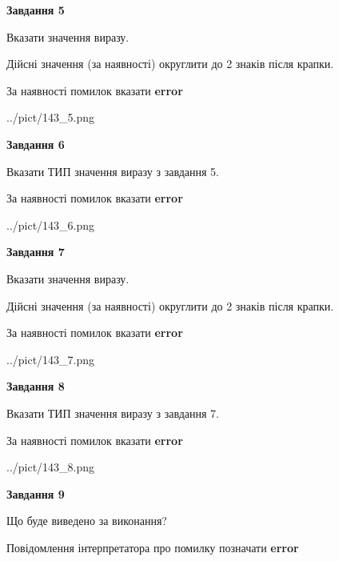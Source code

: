 \documentclass[11pt, ukrainian]{article}
\begin{document}
{\begin {large}
{\begin {center}\textbf{Завдання 5}\end {center}}\par
Вказати значення виразу. \par
Дійсні значення (за наявності) округлити до 2 знаків після крапки. \par
За наявності помилок вказати \textbf{error}

\begin{center}
	{../pict/143_5.png}
\end{center}
\newpage

{\begin {center}\textbf{Завдання 6}\end {center}}\par
Вказати ТИП значення виразу з завдання 5. \par
За наявності помилок вказати \textbf{error}

\begin{center}
	{../pict/143_6.png}
\end{center}
\newpage

{\begin {center}\textbf{Завдання 7}\end {center}}\par
Вказати значення виразу. \par
Дійсні значення (за наявності) округлити до 2 знаків після крапки. \par
За наявності помилок вказати \textbf{error}

\begin{center}
	{../pict/143_7.png}
\end{center}
\newpage

{\begin {center}\textbf{Завдання 8}\end {center}}\par
Вказати ТИП значення виразу з завдання 7. \par
За наявності помилок вказати \textbf{error}

\begin{center}
	{../pict/143_8.png}
\end{center}
\newpage

{\begin {center}\textbf{Завдання 9}\end {center}}\par
Що буде виведено за виконання? \par
Повідомлення інтерпретатора про помилку позначати \textbf{error}


\end{large}}
\end{document}
